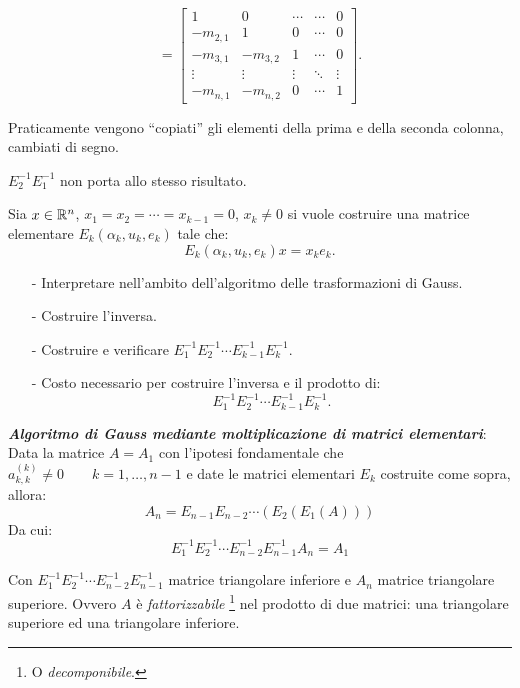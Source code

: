 \[
= \left[\begin{array}{ccccc}
1 & 0 &\cdots  &\cdots & 0 \\
-m_{2,1} & 1 & 0  & \cdots & 0 \\
-m_{3,1} & -m_{3,2} & 1  & \cdots & 0 \\
\vdots & \vdots & \vdots &\ddots &\vdots \\
-m_{n,1} & -m_{n,2} & 0 &\cdots &1
\end{array}\right].
\]

Praticamente vengono ``copiati'' gli elementi della prima e della seconda
colonna, cambiati di segno.
\begin{osse}
$E_2^{-1}E_1^{-1}$ non porta allo stesso risultato.
\end{osse}

\begin{ese}
Sia $x \in \mathbb{R}^n$, $x_1 = x_2 = \cdots = x_{k-1} = 0$, $x_k \neq 0$ si vuole
costruire una matrice elementare $E_k(\alpha_k, u_k, e_k)$ tale che:
\[E_k(\alpha_k, u_k, e_k)x = x_ke_k.\]

\begin{itemize}
\item[-] Interpretare nell'ambito dell'algoritmo delle trasformazioni di
Gauss.
\item[-] Costruire l'inversa.
\item[-] Costruire e verificare  $E_1^{-1}E_2^{-1}\cdots E_{k-1}^{-1}E_k^{-1}$.
\item[-] Costo necessario per costruire l'inversa e il prodotto di:
\[E_1^{-1}E_2^{-1}\cdots E_{k-1}^{-1}E_k^{-1}.\]
\end{itemize}
\end{ese}

\begin{osse}
\textbf{\emph{Algoritmo di Gauss mediante moltiplicazione di matrici elementari}}:
Data la matrice $A = A_1$ con l'ipotesi fondamentale che $a_{k,k}^{(k)} \neq 0 \qquad k = 1, \ldots, n-1$
\textrm{ e date le matrici elementari $E_k$ costruite come sopra, allora:}
\[A_n = E_{n-1}E_{n-2}\cdots \left(E_2\left(E_1\left(A\right)\right)\right)\]
Da cui:
\[ E_1^{-1}E_2^{-1}\cdots E_{n-2}^{-1}E_{n-1}^{-1} A_n = A_1\]

Con $E_1^{-1}E_2^{-1}\cdots E_{n-2}^{-1}E_{n-1}^{-1}$ matrice triangolare inferiore
e $A_n$ matrice triangolare superiore. Ovvero $A$ è \emph{fattorizzabile}
\footnote{O \emph{decomponibile}.} nel prodotto di due matrici: una triangolare
superiore ed una triangolare inferiore.
\end{osse}

